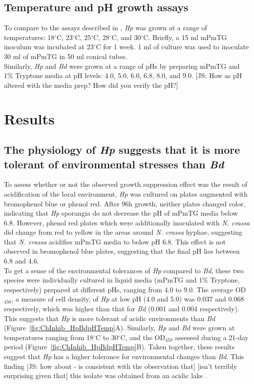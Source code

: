 \subsection*{Temperature and pH growth assays}
To compare to the assays described in \cite{Piotrowski2004}, \textit{Hp} was grown at a range of temperatures: 18$^{\circ}$C, 23$^{\circ}$C, 25$^{\circ}$C, 28$^{\circ}$C, and 30$^{\circ}$C. Briefly, a 15 ml mPmTG inoculum was incubated at 23$^{\circ}$C for 1 week. 1 ml of culture was used to inoculate 30 ml of mPmTG in 50 ml conical tubes. \\
\indent Similarly, \textit{Hp} and \textit{Bd} were grown at a range of pHs by preparing mPmTG and 1\% Tryptone media at pH levels: 4.0, 5.0, 6.0, 6.8, 8.0, and 9.0. [JS: How as pH altered with the media prep? How did you verify the pH?] \\
\section{Results}
\subsection*{The physiology of \textit{Hp} suggests that it is more tolerant of environmental stresses than \textit{Bd}}
To assess whether or not the observed growth suppression effect was the result of acidification of the local environment, \textit{Hp} was cultured on plates augmented with bromophenol blue or phenol red. After 96h growth, neither plates changed color, indicating that \textit{Hp} sporangia do not decrease the pH of mPmTG media below 6.8. However, phenol red plates which were additionally inoculated with \textit{N. crassa} did change from red to yellow in the areas around \textit{N. crassa} hyphae, suggesting that \textit{N. crassa} acidifies mPmTG media to below pH 6.8. This effect is not observed in bromophenol blue plates, suggesting that the final pH lies between 6.8 and 4.6.\\
\indent To get a sense of the environmental tolerances of \textit{Hp} compared to \textit{Bd}, these two species were individually cultured in liquid media (mPmTG and 1\% Tryptone, respectively) prepared at different pHs, ranging from 4.0 to 9.0. The average OD$_{450}$, a measure of cell density, of \textit{Hp} at low pH (4.0 and 5.0) was 0.037 and 0.068 respectively, which was higher than that for \textit{Bd} (0.001 and 0.004 respectively). This suggests that \textit{Hp} is more tolerant of acidic environments than \textit{Bd} (Figure~\ref{fig:ChInhib_HpBdpHTemp}A). Similarly, \textit{Hp} and \textit{Bd} were grown at temperatures ranging from 18$^{\circ}$C to 30$^{\circ}$C, and the OD$_{450}$ assessed during a 21-day period (Figure~\ref{fig:ChInhib_HpBdpHTemp}B). Taken together, these results suggest that \textit{Hp} has a higher tolerance for environmental changes than \textit{Bd}. This finding [JS: how about - is consistent with the observation that] [isn't terribly surprising given that] this isolate was obtained from an acidic lake \cite{Longcore2011}.\\
